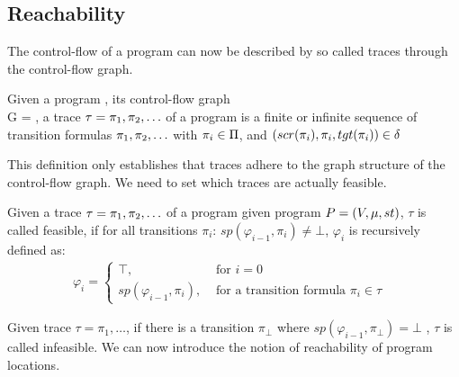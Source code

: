 \subsection{Reachability}
The control-flow of a program can now be described by so called traces through the control-flow graph.
\begin{mydef}
	Given a program	\prg, its control-flow graph \\ G = \cfg, a trace $\tau = \pi_1, \pi_2, \ldots $ of a program is a finite or infinite sequence of transition formulas $\pi_1, \pi_2, \ldots$ with $\pi_i \in \Pi$, and $(scr(\pi_i), \pi_i, tgt(\pi_i)) \in \delta$
\end{mydef}
This definition only establishes that traces adhere to the graph structure of the control-flow graph. We need to set which traces are actually feasible.
\begin{mydef}
	Given a trace $\tau = \pi_1, \pi_2, \ldots $ of a program given program $P = (V, \mu, st)$, $\tau$ is called feasible, if for all transitions $\pi_i$: $sp(\varphi_{i-1}, \pi_i) \neq \bot$, $\varphi_i$ is recursively defined as: 
	\begin{align*}
		\varphi_i = 
		\begin{cases}
			\textbf{$\top$}, & \text{ for } i = 0 \\
			\textbf{$sp(\varphi_{i-1}, \pi_i)$}, & \text{ for a transition formula $\pi_i \in \tau$ }
		\end{cases}
	\end{align*}
\end{mydef}
Given trace $\tau = \pi_1, \ldots$, if there is a transition $\pi_{\bot}$ where $sp(\varphi_{i-1}, \pi_{\bot}) = \bot$ , $\tau$ is called infeasible. We can now introduce the notion of reachability of program locations.
\begin{comment}
	\begin{mydef}[Reachability]
	Given a control-flow graph $\cfg$, we introduce a map $reach: Loc \mapsto \{\varphi\}$ that maps each program location $\ell_i \in Loc$ to a set of states, defined by first order logic formula $\varphi_i$, that are reachable from $\ell_i$. The set of states $\{\varphi_i\}$ is defined as the union $\bigcup\limits_{}^{\tau_j} sp(\varphi_{k-1}, \pi_k)$ for given traces $\tau_j = \pi_1, \ldots, \pi_k$ where $tgt(\pi_k) = \ell_i$. A program location $\ell_i$ is called reachable, if $reach(\ell_i) \neq \{\bot\}$, otherwise $\ell_i$ is called unreachable.
	\end{mydef}
\end{comment}
